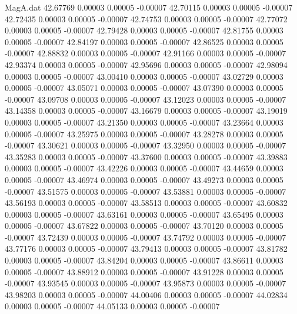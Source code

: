 \begin{filecontents}{MagA.dat}
  42.67769    0.00003    0.00005   -0.00007
  42.70115    0.00003    0.00005   -0.00007
  42.72435    0.00003    0.00005   -0.00007
  42.74753    0.00003    0.00005   -0.00007
  42.77072    0.00003    0.00005   -0.00007
  42.79428    0.00003    0.00005   -0.00007
  42.81755    0.00003    0.00005   -0.00007
  42.84197    0.00003    0.00005   -0.00007
  42.86525    0.00003    0.00005   -0.00007
  42.88832    0.00003    0.00005   -0.00007
  42.91166    0.00003    0.00005   -0.00007
  42.93374    0.00003    0.00005   -0.00007
  42.95696    0.00003    0.00005   -0.00007
  42.98094    0.00003    0.00005   -0.00007
  43.00410    0.00003    0.00005   -0.00007
  43.02729    0.00003    0.00005   -0.00007
  43.05071    0.00003    0.00005   -0.00007
  43.07390    0.00003    0.00005   -0.00007
  43.09708    0.00003    0.00005   -0.00007
  43.12023    0.00003    0.00005   -0.00007
  43.14358    0.00003    0.00005   -0.00007
  43.16679    0.00003    0.00005   -0.00007
  43.19019    0.00003    0.00005   -0.00007
  43.21350    0.00003    0.00005   -0.00007
  43.23664    0.00003    0.00005   -0.00007
  43.25975    0.00003    0.00005   -0.00007
  43.28278    0.00003    0.00005   -0.00007
  43.30621    0.00003    0.00005   -0.00007
  43.32950    0.00003    0.00005   -0.00007
  43.35283    0.00003    0.00005   -0.00007
  43.37600    0.00003    0.00005   -0.00007
  43.39883    0.00003    0.00005   -0.00007
  43.42226    0.00003    0.00005   -0.00007
  43.44659    0.00003    0.00005   -0.00007
  43.46974    0.00003    0.00005   -0.00007
  43.49273    0.00003    0.00005   -0.00007
  43.51575    0.00003    0.00005   -0.00007
  43.53881    0.00003    0.00005   -0.00007
  43.56193    0.00003    0.00005   -0.00007
  43.58513    0.00003    0.00005   -0.00007
  43.60832    0.00003    0.00005   -0.00007
  43.63161    0.00003    0.00005   -0.00007
  43.65495    0.00003    0.00005   -0.00007
  43.67822    0.00003    0.00005   -0.00007
  43.70120    0.00003    0.00005   -0.00007
  43.72439    0.00003    0.00005   -0.00007
  43.74792    0.00003    0.00005   -0.00007
  43.77176    0.00003    0.00005   -0.00007
  43.79413    0.00003    0.00005   -0.00007
  43.81782    0.00003    0.00005   -0.00007
  43.84204    0.00003    0.00005   -0.00007
  43.86611    0.00003    0.00005   -0.00007
  43.88912    0.00003    0.00005   -0.00007
  43.91228    0.00003    0.00005   -0.00007
  43.93545    0.00003    0.00005   -0.00007
  43.95873    0.00003    0.00005   -0.00007
  43.98203    0.00003    0.00005   -0.00007
  44.00406    0.00003    0.00005   -0.00007
  44.02834    0.00003    0.00005   -0.00007
  44.05133    0.00003    0.00005   -0.00007

\end{filecontents}
